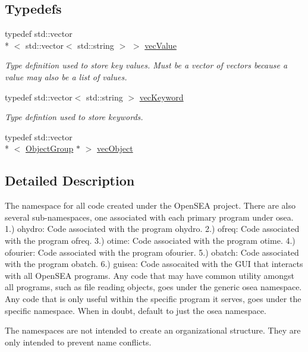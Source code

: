 \subsection*{Typedefs}
\begin{DoxyCompactItemize}
\item 
typedef std\-::vector\\*
$<$ std\-::vector$<$ std\-::string $>$ $>$ \hyperlink{namespaceosea_ae7c5f2bab0fab3931b2ef51a0ad04cc2}{vec\-Value}
\begin{DoxyCompactList}\small\item\em Type definition used to store key values. Must be a vector of vectors because a value may also be a list of values. \end{DoxyCompactList}\item 
typedef std\-::vector$<$ std\-::string $>$ \hyperlink{namespaceosea_af47d453cb217c2c461685cd6e754c070}{vec\-Keyword}
\begin{DoxyCompactList}\small\item\em Type defintion used to store keywords. \end{DoxyCompactList}\item 
typedef std\-::vector\\*
$<$ \hyperlink{classosea_1_1_object_group}{Object\-Group} $\ast$ $>$ \hyperlink{namespaceosea_ab25fb67447fccb23f5683988d96d2dc2}{vec\-Object}
\end{DoxyCompactItemize}


\subsection{Detailed Description}
The namespace for all code created under the Open\-S\-E\-A project. There are also several sub-\/namespaces, one associated with each primary program under osea. 1.) ohydro\-: Code associated with the program ohydro. 2.) ofreq\-: Code associated with the program ofreq. 3.) otime\-: Code associated with the program otime. 4.) ofourier\-: Code associated with the program ofourier. 5.) obatch\-: Code associated with the program obatch. 6.) guisea\-: Code assocaited with the G\-U\-I that interacts with all Open\-S\-E\-A programs. Any code that may have common utility amongst all programs, such as file reading objects, goes under the generic osea namespace. Any code that is only useful within the specific program it serves, goes under the specific namespace. When in doubt, default to just the osea namespace.

The namespaces are not intended to create an organizational structure. They are only intended to prevent name conflicts. 

